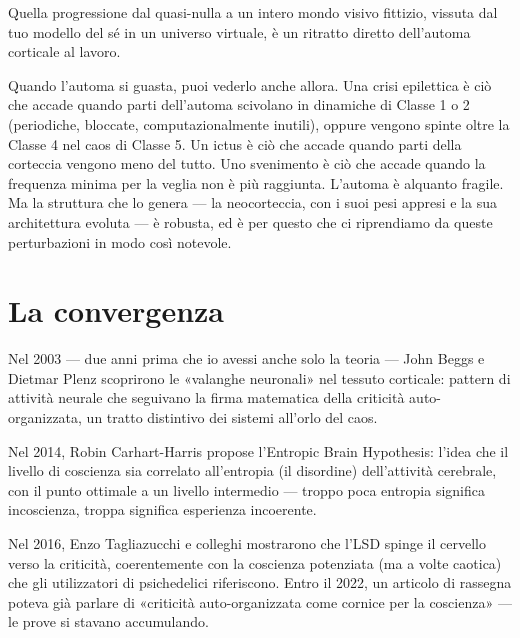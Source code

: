 \documentclass[11pt, twoside, openright]{book}
\begin{document}
Quella progressione dal quasi-nulla a un intero mondo visivo fittizio, vissuta dal tuo modello del sé in un universo virtuale, è un ritratto diretto dell'automa corticale al lavoro.

Quando l'automa si guasta, puoi vederlo anche allora. Una crisi epilettica è ciò che accade quando parti dell'automa scivolano in dinamiche di Classe 1 o 2 (periodiche, bloccate, computazionalmente inutili), oppure vengono spinte oltre la Classe 4 nel caos di Classe 5. Un ictus è ciò che accade quando parti della corteccia vengono meno del tutto. Uno svenimento è ciò che accade quando la frequenza minima per la veglia non è più raggiunta. L'automa è alquanto fragile. Ma la struttura che lo genera --- la neocorteccia, con i suoi pesi appresi e la sua architettura evoluta --- è robusta, ed è per questo che ci riprendiamo da queste perturbazioni in modo così notevole.

\section*{La convergenza}

Nel 2003 --- due anni prima che io avessi anche solo la teoria --- John Beggs e Dietmar Plenz scoprirono le «valanghe neuronali» nel tessuto corticale: pattern di attività neurale che seguivano la firma matematica della criticità auto-organizzata, un tratto distintivo dei sistemi all'orlo del caos.

Nel 2014, Robin Carhart-Harris propose l'Entropic Brain Hypothesis: l'idea che il livello di coscienza sia correlato all'entropia (il disordine) dell'attività cerebrale, con il punto ottimale a un livello intermedio --- troppo poca entropia significa incoscienza, troppa significa esperienza incoerente.

Nel 2016, Enzo Tagliazucchi e colleghi mostrarono che l'LSD spinge il cervello verso la criticità, coerentemente con la coscienza potenziata (ma a volte caotica) che gli utilizzatori di psichedelici riferiscono. Entro il 2022, un articolo di rassegna poteva già parlare di «criticità auto-organizzata come cornice per la coscienza» --- le prove si stavano accumulando.
\end{document}
